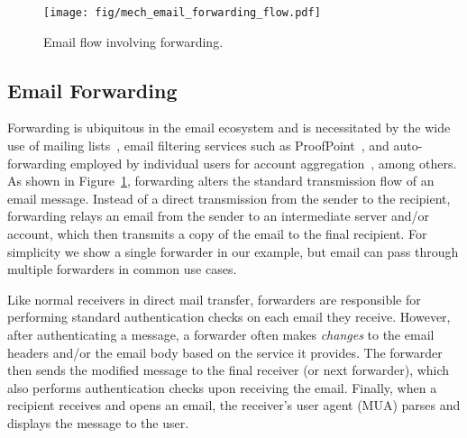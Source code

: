 \begin{figure}[t]
\centerline{\texttt{[image: fig/mech\_email\_forwarding\_flow.pdf]}}
\caption{Email flow involving forwarding.}
\label{fig:email_forwarding_flow}
  \vspace*{-0.1in}
\end{figure}


\subsection{Email Forwarding}
\label{sec:background:fwd:overview}
Forwarding is ubiquitous in the email ecosystem and is necessitated by
the wide use of mailing lists~\cite{Electron8:online}, email filtering
services such as ProofPoint~\cite{SecureEm78:online}, and
auto-forwarding employed by individual users for account
aggregation~\cite{TheBestW9:online}, among others.  As shown in
Figure~\ref{fig:email_forwarding_flow}, forwarding alters the standard
transmission flow of an email message.  Instead of a direct
transmission from the sender to the recipient, forwarding relays an
email from the sender to an intermediate server and/or account, which
then transmits a copy of the email to the final recipient.
For simplicity we show a single forwarder in our example, but email can pass through multiple forwarders in common use cases. %

Like normal receivers in direct mail transfer,
forwarders are responsible for performing standard authentication checks on each email they receive. %
However, after authenticating a message,
a forwarder often makes \emph{changes} to the email headers and/or the
email body based on the service it provides.
The forwarder then sends the modified message to the final receiver (or next forwarder), which also performs authentication checks upon receiving the email.
Finally, when a recipient receives and opens an email, the receiver's user agent (MUA) parses and displays the message to the user.

